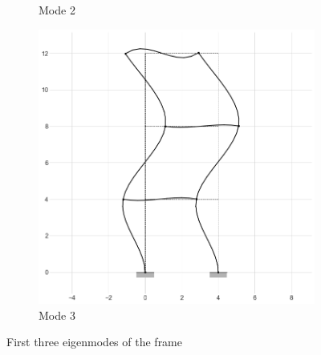 \begin{figure}[H]
\begin{subfigure}[b]{0.33\textwidth}
        \caption{Mode 2}
        \label{m2}
    \end{subfigure}
    \begin{subfigure}[b]{0.33\textwidth}
        \centering
        \includegraphics[width=\textwidth]{Figures/mode3.png}
        \caption{Mode 3}
        \label{m3}
    \end{subfigure}
    \caption{First three eigenmodes of the frame}
    \label{eigModes}
\end{figure}

